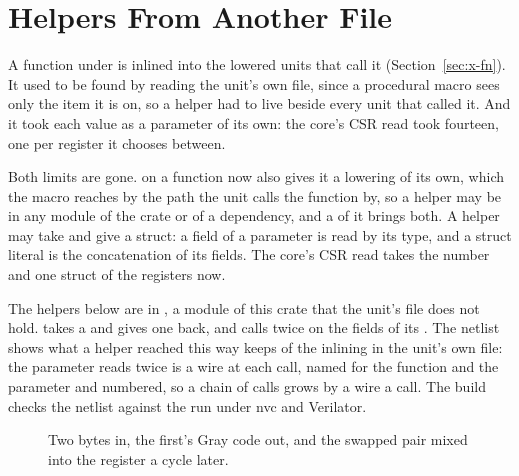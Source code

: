 \section{Helpers From Another File}
\label{sec:x-helpers}

A function under \code{\#[lower]} is inlined into the lowered units
that call it (Section~\ref{sec:x-fn}). It used to be found by reading
the unit's own file, since a procedural macro sees only the item it is
on, so a helper had to live beside every unit that called it. And it
took each value as a parameter of its own: the core's CSR read took
fourteen, one per register it chooses between.

Both limits are gone. \code{\#[lower]} on a function now also gives it
a lowering of its own, which the macro reaches by the path the unit
calls the function by, so a helper may be  in any module of
the crate or of a dependency, and a  of it brings both. A
helper may take and give a struct: a field of a parameter is read by
its type, and a struct literal is the concatenation of its fields. The
core's CSR read takes the number and one struct of the registers now.

The helpers below are in , a module of this
crate that the unit's file does not hold.  takes a
 and gives one back, and  calls  twice
on the fields of its . The netlist shows what a helper
reached this way keeps of the inlining in the unit's own file: the
parameter  reads twice is a wire at each call, named for
the function and the parameter and numbered, so a chain of calls
grows by a wire a call. The build checks the netlist against the run
under nvc and Verilator.



\begin{figure}[htbp]
\centering

\caption{Two bytes in, the first's Gray code out, and the swapped
pair mixed into the register a cycle later.}
\label{fig:x-helpers}
\end{figure}




